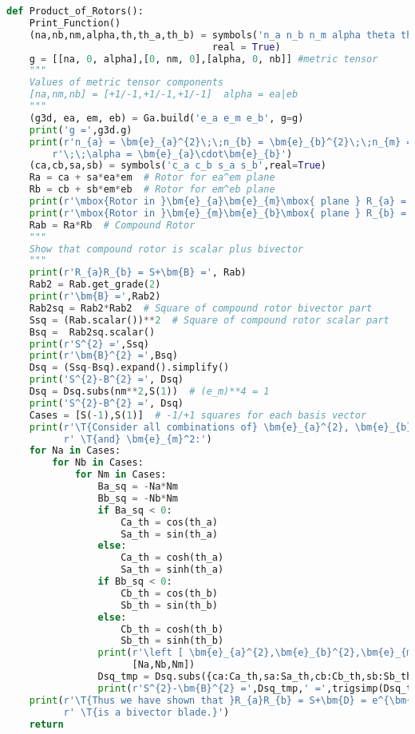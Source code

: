 \documentclass[10pt,fleqn]{report}
\newcommand{\T}[1]{\text{#1}}
\begin{document}
\begin{lstlisting}[language=Python,showspaces=false,showstringspaces=false,backgroundcolor=\color{gray},frame=single]
def Product_of_Rotors():
    Print_Function()
    (na,nb,nm,alpha,th,th_a,th_b) = symbols('n_a n_b n_m alpha theta theta_a theta_b',\
                                    real = True)
    g = [[na, 0, alpha],[0, nm, 0],[alpha, 0, nb]] #metric tensor
    """
    Values of metric tensor components
    [na,nm,nb] = [+1/-1,+1/-1,+1/-1]  alpha = ea|eb
    """
    (g3d, ea, em, eb) = Ga.build('e_a e_m e_b', g=g)
    print('g =',g3d.g)
    print(r'n_{a} = \bm{e}_{a}^{2}\;\;n_{b} = \bm{e}_{b}^{2}\;\;n_{m} = \bm{e}_{m}^{2}'+\
        r'\;\;\alpha = \bm{e}_{a}\cdot\bm{e}_{b}')
    (ca,cb,sa,sb) = symbols('c_a c_b s_a s_b',real=True)
    Ra = ca + sa*ea*em  # Rotor for ea^em plane
    Rb = cb + sb*em*eb  # Rotor for em^eb plane
    print(r'\mbox{Rotor in }\bm{e}_{a}\bm{e}_{m}\mbox{ plane } R_{a} =',Ra)
    print(r'\mbox{Rotor in }\bm{e}_{m}\bm{e}_{b}\mbox{ plane } R_{b} =',Rb)
    Rab = Ra*Rb  # Compound Rotor
    """
    Show that compound rotor is scalar plus bivector
    """
    print(r'R_{a}R_{b} = S+\bm{B} =', Rab)
    Rab2 = Rab.get_grade(2)
    print(r'\bm{B} =',Rab2)
    Rab2sq = Rab2*Rab2  # Square of compound rotor bivector part
    Ssq = (Rab.scalar())**2  # Square of compound rotor scalar part
    Bsq =  Rab2sq.scalar()
    print(r'S^{2} =',Ssq)
    print(r'\bm{B}^{2} =',Bsq)
    Dsq = (Ssq-Bsq).expand().simplify()
    print('S^{2}-B^{2} =', Dsq)
    Dsq = Dsq.subs(nm**2,S(1))  # (e_m)**4 = 1
    print('S^{2}-B^{2} =', Dsq)
    Cases = [S(-1),S(1)]  # -1/+1 squares for each basis vector
    print(r'\T{Consider all combinations of} \bm{e}_{a}^{2}, \bm{e}_{b}^{2}'+\
          r' \T{and} \bm{e}_{m}^2:')
    for Na in Cases:
        for Nb in Cases:
            for Nm in Cases:
                Ba_sq = -Na*Nm
                Bb_sq = -Nb*Nm
                if Ba_sq < 0:
                    Ca_th = cos(th_a)
                    Sa_th = sin(th_a)
                else:
                    Ca_th = cosh(th_a)
                    Sa_th = sinh(th_a)
                if Bb_sq < 0:
                    Cb_th = cos(th_b)
                    Sb_th = sin(th_b)
                else:
                    Cb_th = cosh(th_b)
                    Sb_th = sinh(th_b)
                print(r'\left [ \bm{e}_{a}^{2},\bm{e}_{b}^{2},\bm{e}_{m}^2\right ] =',\
                      [Na,Nb,Nm])
                Dsq_tmp = Dsq.subs({ca:Ca_th,sa:Sa_th,cb:Cb_th,sb:Sb_th,na:Na,nb:Nb,nm:Nm})
                print(r'S^{2}-\bm{B}^{2} =',Dsq_tmp,' =',trigsimp(Dsq_tmp))
    print(r'\T{Thus we have shown that }R_{a}R_{b} = S+\bm{D} = e^{\bm{C}} \T{where} \bm{C}'+\
          r' \T{is a bivector blade.}')
    return

\end{lstlisting}
\end{document}

